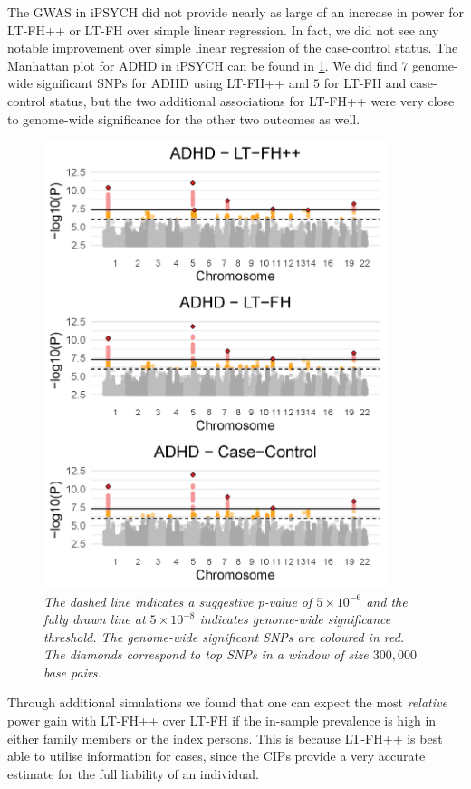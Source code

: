 The GWAS in iPSYCH did not provide nearly as large of an increase in power for LT-FH++ or LT-FH over simple linear regression. In fact, we did not see any notable improvement over simple linear regression of the case-control status. The Manhattan plot for ADHD in iPSYCH can be found in \cref{fig:LTFH++_manhattanADHD}. We did find $ 7 $ genome-wide significant SNPs for ADHD using LT-FH++ and $ 5 $ for LT-FH and case-control status, but the two additional associations for LT-FH++ were very close to genome-wide significance for the other two outcomes as well.
\begin{figure}
	\includegraphics[width=10cm]{results/manhattanPlot_ADHD.png}
	\caption[Manhattan plots for LT-FH++, LT-FH, and case-control GWAS of ADHD in the iPSYCH data]{
		\sl The dashed line indicates a suggestive p-value of $ 5\times 10^{-6} $ and the fully drawn line at $ 5\times 10^{-8} $ indicates genome-wide significance threshold. The genome-wide significant SNPs are coloured in red. The diamonds correspond to top SNPs in a window of size $ 300,000 $ base pairs.}	
	\label{fig:LTFH++_manhattanADHD}
\end{figure}
Through additional simulations we found that one can expect the most \textit{relative} power gain with LT-FH++ over LT-FH if the in-sample prevalence is high in either family members or the index persons. This is because LT-FH++ is best able to utilise information for cases, since the CIPs provide a very accurate estimate for the full liability of an individual.